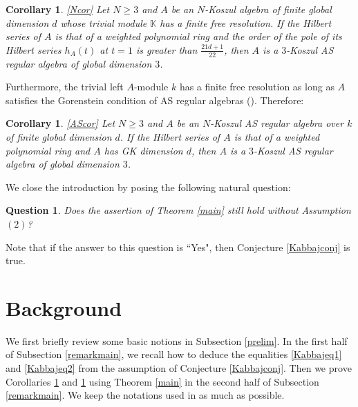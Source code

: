 \documentclass[reqno]{amsart}
\newcommand{\bbK}{\mathbb{K}}
\numberwithin{equation}{section}
\theoremstyle{plain}
\newtheorem{cor}[equation]{Corollary}
\newtheorem{question}[equation]{Question}
\theoremstyle{definition}
\begin{document}

\begin{cor}\label{NKcor}\ref{Ncor}
    Let $N\geq 3$ and $A$ be an $N$-Koszul algebra of finite global dimension $d$ whose trivial module $\bbK$ has a finite free resolution.
    If the Hilbert series of $A$ is that of a weighted polynomial ring and the order of the pole of its Hilbert series $h_A(t)$ at $t=1$ is greater than $\frac{21d+1}{22}$, then $A$ is a $3$-Koszul AS regular algebra of global dimension $3$.
\end{cor}


Furthermore, the trivial left $A$-module $k$ has a finite free resolution as long as $A$ satisfies the Gorenstein condition of AS regular algebras (\cite[Proposition 3.1]{StephensonZhang}). Therefore:

\begin{cor}\label{ASRcor}\ref{AScor}
    Let $N\geq 3$ and $A$ be an $N$-Koszul AS regular algebra over $k$ of finite global dimension $d$. If the Hilbert series of $A$ is that of a weighted polynomial ring and $A$ has GK dimension $d$, then $A$ is a $3$-Koszul AS regular algebra of global dimension $3$. 
\end{cor}

We close the introduction by posing the following natural question:

\begin{question}
    Does the assertion of Theorem \ref{main} still hold without Assumption $(2)$?
\end{question}

Note that if the answer to this question is “Yes", then Conjecture \ref{Kabbajconj} is true.

\section{Background}

We first briefly review some basic notions in Subsection \ref{prelim}. In the first half of Subsection \ref{remarkmain}, we recall how to deduce the equalities \ref{Kabbajeq1} and \ref{Kabbajeq2} from the assumption of Conjecture \ref{Kabbajconj}. Then we prove Corollaries \ref{NKcor} and \ref{ASRcor} using Theorem \ref{main} in the second half of Subsection \ref{remarkmain}. We keep the notations used in \cite{Kabbaj} as much as possible. 
\end{document}
